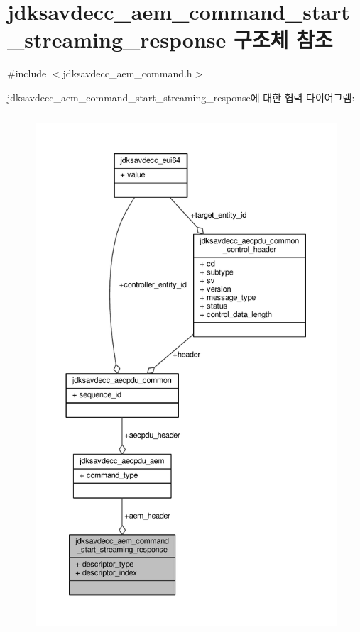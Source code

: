 \hypertarget{structjdksavdecc__aem__command__start__streaming__response}{}\section{jdksavdecc\+\_\+aem\+\_\+command\+\_\+start\+\_\+streaming\+\_\+response 구조체 참조}
\label{structjdksavdecc__aem__command__start__streaming__response}


{\ttfamily \#include $<$jdksavdecc\+\_\+aem\+\_\+command.\+h$>$}



jdksavdecc\+\_\+aem\+\_\+command\+\_\+start\+\_\+streaming\+\_\+response에 대한 협력 다이어그램\+:
\nopagebreak
\begin{figure}[H]
\begin{center}
\leavevmode
\includegraphics[height=550pt]{structjdksavdecc__aem__command__start__streaming__response__coll__graph}
\end{center}
\end{figure}
